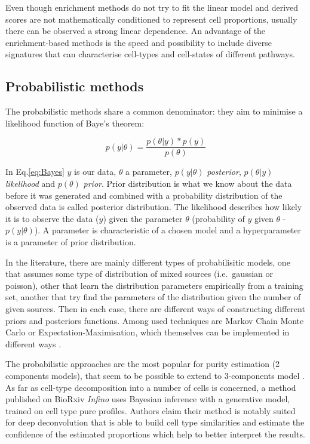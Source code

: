\documentclass[12pt,]{book}
\theoremstyle{definition}
\theoremstyle{definition}
\theoremstyle{definition}
\theoremstyle{remark}
\begin{document}
Even though enrichment methods do not try to fit the linear model and
derived scores are not mathematically conditioned to represent cell
proportions, usually there can be observed a strong linear dependence.
An advantage of the enrichment-based methods is the speed and
possibility to include diverse signatures that can characterise
cell-types and cell-states of different pathways.

\hypertarget{probabilistic-methods}{%
\subsection{Probabilistic methods}\label{probabilistic-methods}}

The probabilistic methods share a common denominator: they aim to
minimise a likelihood function of Baye's theorem:

\begin{equation} 
p(y|\theta) = \frac{p(\theta|y )* p(y)}{p(\theta)} \label{eq:Bayes}
\end{equation}

In Eq.\eqref{eq:Bayes} \(y\) is our data, \(\theta\) a parameter,
\(p(y|\theta)\) \emph{posterior}, \(p(\theta|y )\) \emph{likelihood} and
\(p(\theta)\) \emph{prior}. Prior distribution is what we know about the
data before it was generated and combined with a probability
distribution of the observed data is called posterior distribution. The
likelihood describes how likely it is to observe the data (\(y\)) given
the parameter \(\theta\) (probability of \(y\) given \(\theta\) -
\(p(y|\theta)\)). A parameter is characteristic of a chosen model and a
hyperparameter is a parameter of prior distribution.

In the literature, there are mainly different types of probabilisitic
models, one that assumes some type of distribution of mixed sources
(i.e.~gaussian or poisson), other that learn the distribution parameters
empirically from a training set, another that try find the parameters of
the distribution given the number of given sources. Then in each case,
there are different ways of constructing different priors and posteriors
functions. Among used techniques are Markov Chain Monte Carlo or
Expectation-Maximisation, which themselves can be implemented in
different ways
\citep[\citet{Zaslavsky2017}]{Erkkila2010, Ghosh2004, Lahdesmaki2005, Li2013, Roy2006}.

The probabilistic approaches are the most popular for purity estimation
(2 components models), that seem to be possible to extend to
3-components model \citep{Wang2017}. As far as cell-type decomposition
into a number of cells is concerned, a method published on BioRxiv
\emph{Infino} uses Bayesian inference with a generative model, trained
on cell type pure profiles. Authors claim their method is notably suited
for deep deconvolution that is able to build cell type similarities and
estimate the confidence of the estimated proportions which help to
better interpret the results.
\end{document}
